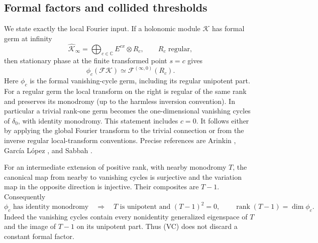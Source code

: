 \documentclass[11pt,a4paper]{article}
\theoremstyle{definition}
\theoremstyle{remark}
\numberwithin{equation}{section}
\begin{document}
\subsection{Formal factors and collided thresholds}

We state exactly the local Fourier input. If a holonomic module
$\mathcal K$ has formal germ at infinity
\[
 \widehat{\mathcal K}_\infty
       =\bigoplus_{c\in\mathbb C}E^{cx}\otimes R_c,
 \qquad R_c\text{ regular},
\]
then stationary phase at the finite transformed point $s=c$ gives
\[
 \phi_c(\mathcal F\mathcal K)
       \simeq\mathcal F^{(\infty,0)}(R_c).
 \tag{LF}
\]
Here $\phi_c$ is the formal vanishing-cycle germ, including its
regular unipotent part. For a regular germ the local transform on
the right is regular of the same rank and preserves its monodromy
(up to the harmless inversion convention). In particular a trivial
rank-one germ becomes the one-dimensional vanishing cycles of
$\delta_0$, with identity monodromy. This statement includes $c=0$.
It follows either by applying the global Fourier transform to the
trivial connection or from the inverse regular local-transform
conventions. Precise references are Arinkin
\cite[Corollary 2.3(1), \S3.3]{p8:LJR_Arinkin}, Garc\'ia L\'opez
\cite[Proposition 2.1]{p5:BG_GarciaLopez2004}, and Sabbah
\cite[Remarks 5.2, 5.3(4), 5.7]{p5:BG_Sabbah2008}.

For an intermediate extension of positive rank, with nearby
monodromy $T$, the canonical map from nearby to vanishing cycles
is surjective and the variation map in the opposite direction
is injective. Their composites are $T-1$. Consequently
\[
 \phi_c\text{ has identity monodromy}
 \quad\Longrightarrow\quad
 T\text{ is unipotent and }(T-1)^2=0,
 \qquad\operatorname{rank}(T-1)=\dim\phi_c.
 \tag{VC}
\]
Indeed the vanishing cycles contain every nonidentity generalized
eigenspace of $T$ and the image of $T-1$ on its unipotent part.
Thus (VC) does not discard a constant formal factor.
\end{document}
